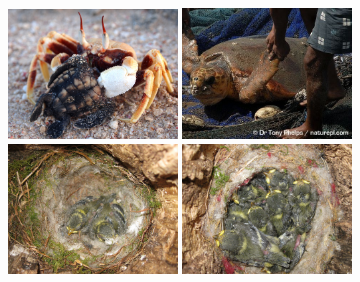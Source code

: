 \documentclass[10pt]{beamer}%
\begin{document}
\begin{frame}
	\begin{figure}
		\includegraphics[width=0.4\textwidth,height=0.3\textwidth]{Figures/babyTurtle} \hspace{1pt}
		\includegraphics[width=0.4\textwidth,height=0.3\textwidth]{Figures/adultTurtle}
		\vspace{1pt}
		\includegraphics[width=0.4\textwidth,height=0.3\textwidth]{Figures/BlueTits2}\hspace{1pt}
		\includegraphics[width=0.4\textwidth,height=0.3\textwidth]{Figures/BlueTits8}
	\end{figure}
\end{frame}

%
\begin{frame}

	\begin{figure}

	\end{figure}

\end{frame}
\end{document}
